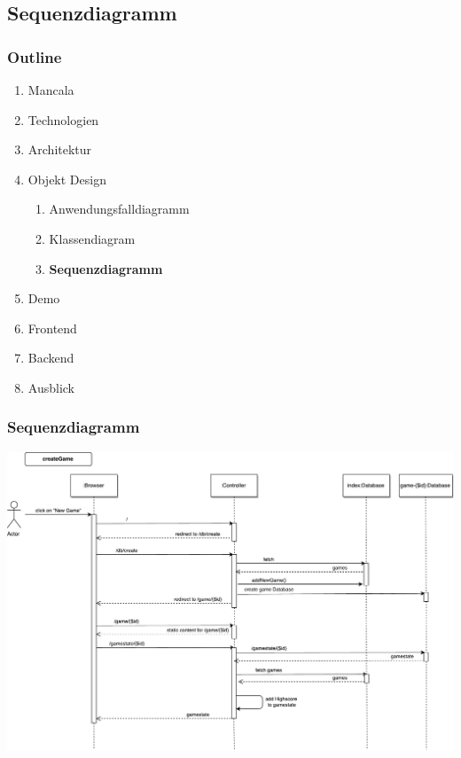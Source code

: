 \documentclass[
	10pt,
	t		%
]{beamer}
\begin{document}
\subsection{Sequenzdiagramm}
\begin{frame}
\frametitle{Outline}
\begin{enumerate}
\item Mancala
\item Technologien
\item Architektur
\item Objekt Design
\begin{enumerate}
\item Anwendungsfalldiagramm
\item Klassendiagram
\item \textbf{Sequenzdiagramm}
\end{enumerate}
\item Demo
\item Frontend
\item Backend
\item Ausblick
\end{enumerate}
\end{frame}

\begin{frame}
\frametitle{Sequenzdiagramm}
\begin{center}
\includegraphics[scale=0.25]{./../Diagrams/Sequence_createGame.pdf}
\end{center}
\end{frame}
\end{document}
